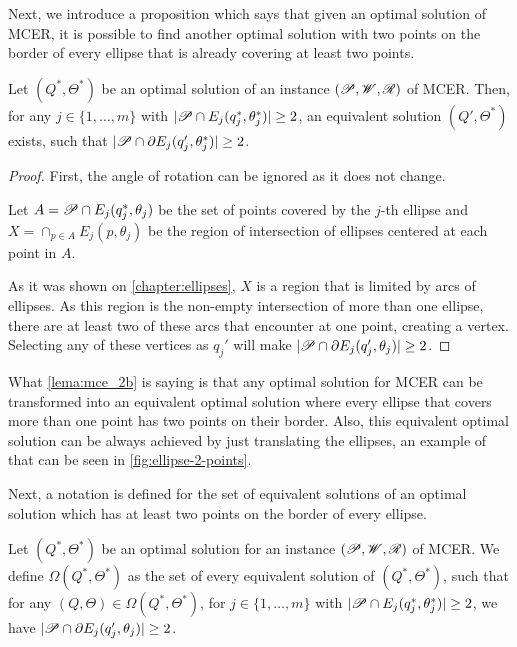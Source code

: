 Next, we introduce a proposition which says that given an optimal solution of MCER, it is possible to find another optimal solution with two points on the border of every ellipse that is already covering at least two points.

\begin{proposicao}\label{lema:mce_2b}
	Let $(Q^*, \Theta^*)$ be an optimal solution of an instance $(\mathscr{P}, \mathscr{W}, \mathscr{R})$ of MCER. 
	Then, for any $j\in\{1, \dots, m\}$ with $|\mathscr{P} \cap E_j(q_j^*, \theta_j^*)|\ge2$, 
	an equivalent solution $(Q', \Theta^*)$ exists, such that $|\mathscr{P} \cap \partial E_j(q_j', \theta_j^*)|\ge 2$.
\end{proposicao}

\begin{proof}
	First, the angle of rotation can be ignored as it does not change.
	
	Let $A=\mathscr{P} \cap E_j(q_j^*, \theta_j)$ be the set of points covered by the $j$-th ellipse and $X=\cap_{p \in A}E_j(p, \theta_j)$ be the region of intersection of ellipses centered at each point in $A$.

	As it was shown on \autoref{chapter:ellipses}, $X$ is a region that is limited by arcs of ellipses. As this region is the non-empty intersection of more than one ellipse, there are at least two of these arcs that encounter at one point, creating a vertex. Selecting any of these vertices as $q_j'$ will make $|\mathscr{P} \cap \partial E_j(q_j', \theta_j)| \ge 2$.
	
\end{proof}

What \autoref{lema:mce_2b} is saying is that any optimal solution for MCER can be transformed into an equivalent optimal solution where every ellipse that covers more than one point has two points on their border. Also, this equivalent optimal solution can be always achieved by just translating the ellipses, an example of that can be seen in \autoref{fig:ellipse-2-points}. 

Next, a notation is defined for the set of equivalent solutions of an optimal solution which has at least two points on the border of every ellipse.

\begin{definicao}
	Let $(Q^*, \Theta^*)$ be an optimal solution for an instance $(\mathscr{P}, \mathscr{W}, \mathscr{R})$ of MCER. We define $\Omega(Q^*, \Theta^*)$ as the set of every equivalent solution of $(Q^*, \Theta^*)$, such that for any $(Q, \Theta)\in\Omega(Q^*, \Theta^*)$, for $j\in\{1, \dots, m\}$ with $|\mathscr{P} \cap E_j(q_j^*, \theta_j^*)|\ge2$, we have $|\mathscr{P} \cap \partial E_j(q_j', \theta_j)| \ge 2$.
\end{definicao}

